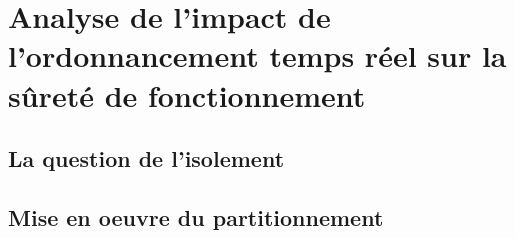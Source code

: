 \section{Analyse de l'impact de l'ordonnancement temps réel sur la sûreté de fonctionnement}
\label{sec:contribution_sdf-tr_impact2}

\subsection{La question de l'isolement}
\subsection{Mise en oeuvre du partitionnement}


